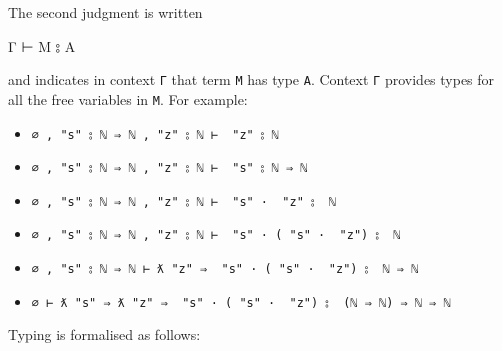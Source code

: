 The second judgment is written

\begin{myDisplay}
Γ ⊢ M ⦂ A
\end{myDisplay}

and indicates in context \texttt{Γ} that term \texttt{M} has type
\texttt{A}. Context \texttt{Γ} provides types for all the free variables
in \texttt{M}. For example:

\begin{itemize}
\tightlist
\item
  \texttt{∅\ ,\ "s"\ ⦂\ \textasciigrave{}ℕ\ ⇒\ \textasciigrave{}ℕ\ ,\ "z"\ ⦂\ \textasciigrave{}ℕ\ ⊢\ \textasciigrave{}\ "z"\ ⦂\ \textasciigrave{}ℕ}
\item
  \texttt{∅\ ,\ "s"\ ⦂\ \textasciigrave{}ℕ\ ⇒\ \textasciigrave{}ℕ\ ,\ "z"\ ⦂\ \textasciigrave{}ℕ\ ⊢\ \textasciigrave{}\ "s"\ ⦂\ \textasciigrave{}ℕ\ ⇒\ \textasciigrave{}ℕ}
\item
  \texttt{∅\ ,\ "s"\ ⦂\ \textasciigrave{}ℕ\ ⇒\ \textasciigrave{}ℕ\ ,\ "z"\ ⦂\ \textasciigrave{}ℕ\ ⊢\ \textasciigrave{}\ "s"\ ·\ \textasciigrave{}\ "z"\ ⦂\ \ \textasciigrave{}ℕ}
\item
  \texttt{∅\ ,\ "s"\ ⦂\ \textasciigrave{}ℕ\ ⇒\ \textasciigrave{}ℕ\ ,\ "z"\ ⦂\ \textasciigrave{}ℕ\ ⊢\ \textasciigrave{}\ "s"\ ·\ (\textasciigrave{}\ "s"\ ·\ \textasciigrave{}\ "z")\ ⦂\ \ \textasciigrave{}ℕ}
\item
  \texttt{∅\ ,\ "s"\ ⦂\ \textasciigrave{}ℕ\ ⇒\ \textasciigrave{}ℕ\ ⊢\ ƛ\ "z"\ ⇒\ \textasciigrave{}\ "s"\ ·\ (\textasciigrave{}\ "s"\ ·\ \textasciigrave{}\ "z")\ ⦂\ \ \textasciigrave{}ℕ\ ⇒\ \textasciigrave{}ℕ}
\item
  \texttt{∅\ ⊢\ ƛ\ "s"\ ⇒\ ƛ\ "z"\ ⇒\ \textasciigrave{}\ "s"\ ·\ (\textasciigrave{}\ "s"\ ·\ \textasciigrave{}\ "z")\ ⦂\ \ (\textasciigrave{}ℕ\ ⇒\ \textasciigrave{}ℕ)\ ⇒\ \textasciigrave{}ℕ\ ⇒\ \textasciigrave{}ℕ}
\end{itemize}

Typing is formalised as follows:

